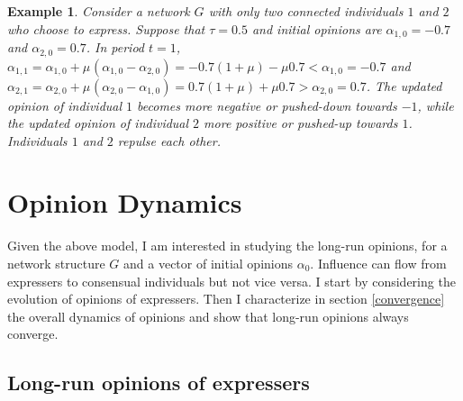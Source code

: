 \documentclass{article}
\newtheorem{example}{Example}
\begin{document}


 
%
\begin{example} Consider a network $G$ with only two connected individuals $1$ and $2$ who choose to express. Suppose that $\tau=0.5$ and initial opinions are  $\alpha_{1,0}=-0.7$ and $\alpha_{2,0}=0.7$. In period $t=1$, $\alpha_{1,1} = \alpha_{1,0} + \mu_{} ( \alpha_{1,0} - \alpha_{2,0}) =  -0.7 (1 + \mu) - \mu 0.7 < \alpha_{1,0} = -0.7 $ and  $\alpha_{2,1} = \alpha_{2,0} + \mu_{} ( \alpha_{2,0} - \alpha_{1,0}) = 0.7 (1+\mu) + \mu 0.7 > \alpha_{2,0} =0.7$. The updated opinion of individual $1$ becomes more negative or pushed-down towards $-1$, while the updated opinion of individual $2$ more positive or pushed-up towards $1$. Individuals $1$ and $2$ repulse each other. 
\end{example} 





\section{Opinion Dynamics} \label{eq}

Given the above model, I am interested in studying the long-run opinions, for a network structure $G$ and a vector of initial opinions $\alpha_0$. Influence can flow from expressers to consensual individuals but not vice versa. I start by considering the evolution of opinions of expressers. Then I characterize in section \ref{convergence} the overall dynamics of opinions and show that long-run opinions always converge.  

\subsection{Long-run opinions of expressers}
\label{LRexpressers}
\end{document}

